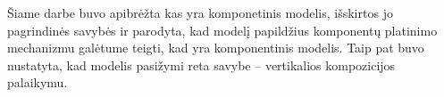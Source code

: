

Šiame darbe buvo apibrėžta kas yra komponetinis modelis, išskirtos
jo pagrindinės savybės ir parodyta, kad  modelį
papildžius komponentų platinimo mechanizmu galėtume teigti, kad
 yra komponentinis modelis. Taip pat buvo nustatyta,
kad  modelis pasižymi reta savybe – vertikalios
kompozicijos palaikymu.
